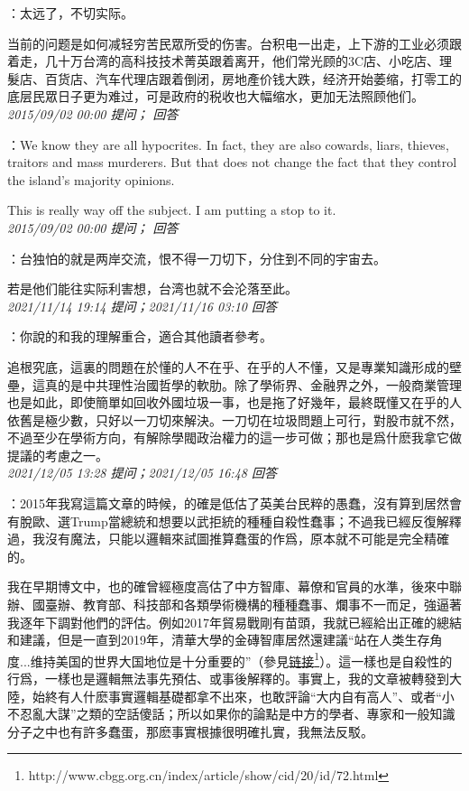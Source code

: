 \documentclass[twocolumn]{ctexart}
\begin{document}
：太远了，不切实际。

当前的问题是如何减轻穷苦民眾所受的伤害。台积电一出走，上下游的工业必须跟着走，几十万台湾的高科技技术菁英跟着离开，他们常光顾的3C店、小吃店、理髮店、百货店、汽车代理店跟着倒闭，房地產价钱大跌，经济开始萎缩，打零工的底层民眾日子更为难过，可是政府的税收也大幅缩水，更加无法照顾他们。\\

\textit{\hfill\noindent\small 2015/09/02 00:00 提问； 回答}

：We know they are all hypocrites. In fact, they are also cowards, liars, thieves, traitors and mass murderers. But that does not change the fact that they control the island's majority opinions.

This is really way off the subject. I am putting a stop to it.\\

\textit{\hfill\noindent\small 2015/09/02 00:00 提问； 回答}

：台独怕的就是两岸交流，恨不得一刀切下，分住到不同的宇宙去。

若是他们能往实际利害想，台湾也就不会沦落至此。\\

\textit{\hfill\noindent\small 2021/11/14 19:14 提问；2021/11/16 03:10 回答}

：你說的和我的理解重合，適合其他讀者參考。

追根究底，這裏的問題在於懂的人不在乎、在乎的人不懂，又是專業知識形成的壁壘，這真的是中共理性治國哲學的軟肋。除了學術界、金融界之外，一般商業管理也是如此，即使簡單如回收外國垃圾一事，也是拖了好幾年，最終既懂又在乎的人依舊是極少數，只好以一刀切來解決。一刀切在垃圾問題上可行，對股市就不然，不過至少在學術方向，有解除學閥政治權力的這一步可做；那也是爲什麽我拿它做提議的考慮之一。
\\

\textit{\hfill\noindent\small 2021/12/05 13:28 提问；2021/12/05 16:48 回答}

：2015年我寫這篇文章的時候，的確是低估了英美台民粹的愚蠢，沒有算到居然會有脫歐、選Trump當總統和想要以武拒統的種種自殺性蠢事；不過我已經反復解釋過，我沒有魔法，只能以邏輯來試圖推算蠢蛋的作爲，原本就不可能是完全精確的。

我在早期博文中，也的確曾經極度高估了中方智庫、幕僚和官員的水準，後來中聯辦、國臺辦、教育部、科技部和各類學術機構的種種蠢事、爛事不一而足，強逼著我逐年下調對他們的評估。例如2017年貿易戰剛有苗頭，我就已經給出正確的總結和建議，但是一直到2019年，清華大學的金磚智庫居然還建議“站在人类生存角度...维持美国的世界大国地位是十分重要的”（參見\href{http://www.cbgg.org.cn/index/article/show/cid/20/id/72.html}{链接\footnote{\url{http://www.cbgg.org.cn/index/article/show/cid/20/id/72.html}}}）。這一樣也是自殺性的行爲，一樣也是邏輯無法事先預估、或事後解釋的。事實上，我的文章被轉發到大陸，始終有人什麽事實邏輯基礎都拿不出來，也敢評論“大内自有高人”、或者“小不忍亂大謀”之類的空話傻話；所以如果你的論點是中方的學者、專家和一般知識分子之中也有許多蠢蛋，那麽事實根據很明確扎實，我無法反駁。
\end{document}
